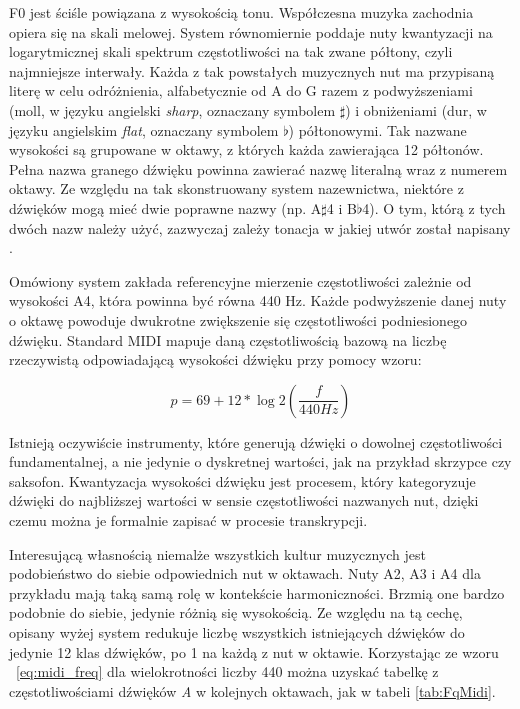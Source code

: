 \documentclass[12pt,a4paper,twoside]{mwart}
\begin{document}
F0 jest ściśle powiązana z wysokością tonu. Współczesna muzyka zachodnia opiera się na skali melowej. System równomiernie poddaje nuty kwantyzacji na logarytmicznej skali spektrum częstotliwości na tak zwane półtony, czyli najmniejsze interwały. Każda z tak powstałych muzycznych nut ma przypisaną literę w celu odróżnienia, alfabetycznie od A do G razem z podwyższeniami (moll, w języku angielski \textit{sharp}, oznaczany symbolem $\sharp$) i obniżeniami (dur, w języku angielskim \textit{flat}, oznaczany symbolem $\flat$) półtonowymi. Tak nazwane wysokości są grupowane w oktawy, z których każda zawierająca 12 półtonów. Pełna nazwa granego dźwięku powinna zawierać nazwę literalną wraz z numerem oktawy. Ze względu na tak skonstruowany system nazewnictwa, niektóre z dźwięków mogą mieć dwie poprawne nazwy (np. A$\sharp$4 i B$\flat$4). O tym, którą z tych dwóch nazw należy użyć, zazwyczaj zależy tonacja w jakiej utwór został napisany 
\cite[215-220]{Transcription:Burns:InversalScalesTuning}.

Omówiony system zakłada referencyjne mierzenie częstotliwości zależnie od wysokości A4, która powinna być równa 440 Hz. Każde podwyższenie danej nuty o oktawę powoduje dwukrotne zwiększenie się częstotliwości podniesionego dźwięku. Standard MIDI
\cite[67-71]{Homerecording:LevelUp}
mapuje daną częstotliwością bazową na liczbę rzeczywistą odpowiadającą wysokości dźwięku przy pomocy wzoru:

\begin{equation} \label{eq:midi_freq}
p = 69 + 12 * \log{2}(\frac{f}{440 Hz})
\end{equation}

Istnieją oczywiście instrumenty, które generują dźwięki o dowolnej częstotliwości fundamentalnej, a nie jedynie o dyskretnej wartości, jak na przykład skrzypce czy saksofon. Kwantyzacja wysokości dźwięku jest procesem, który kategoryzuje dźwięki do najbliższej wartości w sensie częstotliwości nazwanych nut, dzięki czemu można je formalnie zapisać w procesie transkrypcji.

Interesującą własnością niemalże wszystkich kultur muzycznych jest podobieństwo do siebie odpowiednich nut w oktawach. Nuty A2, A3 i A4 dla przykładu mają taką samą rolę w kontekście harmoniczności. Brzmią one bardzo podobnie do siebie, jedynie różnią się wysokością. Ze względu na tą cechę, opisany wyżej system redukuje liczbę wszystkich istniejących dźwięków do jedynie 12 klas dźwięków, po 1 na każdą z nut w oktawie. Korzystając ze wzoru ~\ref{eq:midi_freq} dla wielokrotności liczby 440 można uzyskać tabelkę z częstotliwościami dźwięków \textit{A} w kolejnych oktawach, jak w tabeli \ref{tab:FqMidi}.
\end{document}
